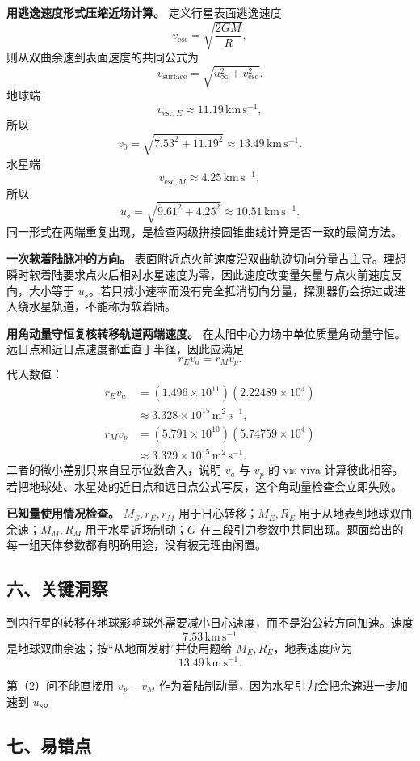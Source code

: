 \documentclass[12pt,a4paper,UTF8]{ctexart}
\begin{document}
\textbf{用逃逸速度形式压缩近场计算。} 定义行星表面逃逸速度 \[
v_{\mathrm{esc}}=\sqrt{\frac{2GM}{R}},
\] 则从双曲余速到表面速度的共同公式为 \[
v_{\mathrm{surface}}
=\sqrt{u_\infty^2+v_{\mathrm{esc}}^2}.
\] 地球端 \[
v_{\mathrm{esc},E}\approx11.19\,\mathrm{km\,s^{-1}},
\] 所以 \[
v_0=\sqrt{7.53^2+11.19^2}
\approx13.49\,\mathrm{km\,s^{-1}}.
\] 水星端 \[
v_{\mathrm{esc},M}\approx4.25\,\mathrm{km\,s^{-1}},
\] 所以 \[
u_s=\sqrt{9.61^2+4.25^2}
\approx10.51\,\mathrm{km\,s^{-1}}.
\]
同一形式在两端重复出现，是检查两级拼接圆锥曲线计算是否一致的最简方法。

\textbf{一次软着陆脉冲的方向。}
表面附近点火前速度沿双曲轨迹切向分量占主导。理想瞬时软着陆要求点火后相对水星速度为零，因此速度改变量矢量与点火前速度反向，大小等于
\(u_s\)。若只减小速率而没有完全抵消切向分量，探测器仍会掠过或进入绕水星轨道，不能称为软着陆。

\textbf{用角动量守恒复核转移轨道两端速度。}
在太阳中心力场中单位质量角动量守恒。远日点和近日点速度都垂直于半径，因此应满足
\[
r_Ev_a=r_Mv_p.
\] 代入数值： \[
\begin{aligned}
r_Ev_a
&=(1.496\times10^{11})
(2.22489\times10^4)\\
&\approx3.328\times10^{15}\,\mathrm{m^2\,s^{-1}},
\\
r_Mv_p
&=(5.791\times10^{10})
(5.74759\times10^4)\\
&\approx3.329\times10^{15}\,\mathrm{m^2\,s^{-1}}.
\end{aligned}
\] 二者的微小差别只来自显示位数舍入，说明 \(v_a\) 与 \(v_p\) 的 vis-viva
计算彼此相容。若把地球处、水星处的近日点和远日点公式写反，这个角动量检查会立即失败。

\textbf{已知量使用情况检查。} \(M_S,r_E,r_M\) 用于日心转移；\(M_E,R_E\)
用于从地表到地球双曲余速；\(M_M,R_M\) 用于水星近场制动；\(G\)
在三段引力参数中共同出现。题面给出的每一组天体参数都有明确用途，没有被无理由闲置。

\subsection{六、关键洞察}\label{ux516dux5173ux952eux6d1eux5bdf-7}

到内行星的转移在地球影响球外需要减小日心速度，而不是沿公转方向加速。速度
\[
7.53\,\mathrm{km\,s^{-1}}
\] 是地球双曲余速；按``从地面发射''并使用题给 \(M_E,R_E\)，地表速度应为
\[
13.49\,\mathrm{km\,s^{-1}}.
\]

第（2）问不能直接用 \(v_p-v_M\)
作为着陆制动量，因为水星引力会把余速进一步加速到 \(u_s\)。

\subsection{七、易错点}\label{ux4e03ux6613ux9519ux70b9-7}
\end{document}
